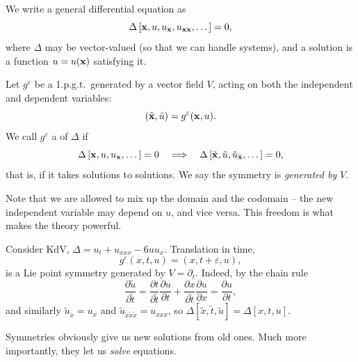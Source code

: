 \documentclass[a4paper]{scrartcl}
\begin{document}
We write a general differential equation as
$$
\Delta\left[\mathbf{x}, u, u_{\mathbf{x}}, u_{\mathbf{x}\mathbf{x}}, \dots\right] = 0,
$$
where $\Delta$ may be vector-valued (so that we can handle systems), and a solution is a function $u = u(\mathbf{x})$ satisfying it.

\begin{definition}
	Let $g^\varepsilon$ be a 1.p.g.t.\ generated by a vector field $V$, acting on both the independent and dependent variables:
	$$
	\left(\tilde{\mathbf{x}}, \tilde u\right) = g^\varepsilon(\mathbf{x}, u).
	$$
	We call $g^\varepsilon$ a  of $\Delta$ if
	$$
	\Delta\left[\mathbf{x}, u, u_{\mathbf{x}},\dots\right] = 0 \quad\Longrightarrow\quad \Delta\left[\tilde{\mathbf{x}},\tilde u, \tilde u_{\tilde{\mathbf{x}}},\dots\right] = 0,
	$$
	that is, if it takes solutions to solutions. We say the symmetry is \emph{generated by} $V$.
\end{definition}

Note that we are allowed to mix up the domain and the codomain -- the new independent variable may depend on $u$, and vice versa. This freedom is what makes the theory powerful.

\begin{example}
	Consider KdV, $\Delta = u_t + u_{xxx} - 6uu_x$. Translation in time,
	$$
	g^\varepsilon(x,t,u) = (x, t+\varepsilon, u),
	$$
	is a Lie point symmetry generated by $V = \partial_t$. Indeed, by the chain rule
	$$
	\frac{\partial\tilde u}{\partial\tilde t} = \frac{\partial t}{\partial\tilde t}\frac{\partial u}{\partial t} + \frac{\partial x}{\partial\tilde t}\frac{\partial u}{\partial x} = \frac{\partial u}{\partial t},
	$$
	and similarly $\tilde u_{\tilde x} = u_x$ and $\tilde u_{\tilde x\tilde x\tilde x} = u_{xxx}$, so $\Delta[\tilde x,\tilde t,\tilde u] = \Delta[x,t,u]$.
\end{example}

Symmetries obviously give us new solutions from old ones. Much more importantly, they let us \emph{solve} equations.
\end{document}

